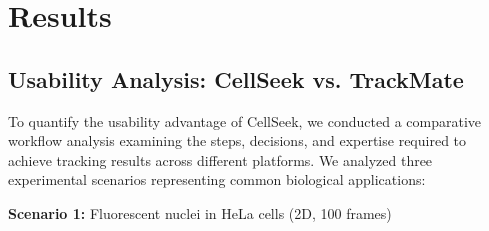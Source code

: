 \documentclass[../cellseek_paper.tex]{subfiles}
\begin{document}
\section{Results}




\subsection{Usability Analysis: CellSeek vs. TrackMate}

To quantify the usability advantage of CellSeek, we conducted a comparative workflow analysis examining the steps, decisions, and expertise required to achieve tracking results across different platforms. We analyzed three experimental scenarios representing common biological applications:

\textbf{Scenario 1:} Fluorescent nuclei in HeLa cells (2D, 100 frames)
\end{document}
